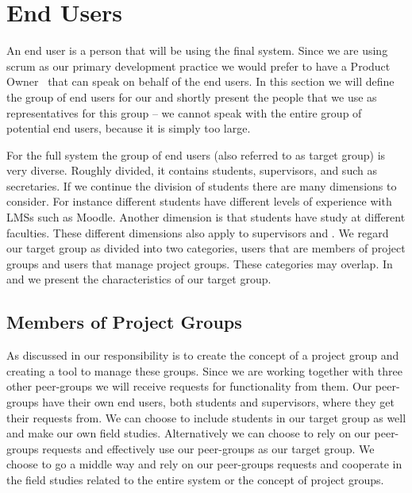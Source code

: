 \section{End Users}
\label{sec:enduser}
An end user is a person that will be using the final system.
Since we are using scrum as our primary development practice we would prefer to have a Product Owner~\cite[p.~115]{Larman04} that can speak on behalf of the end users.
In this section we will define the group of end users for our \subsystem{} and shortly present the people that we use as representatives for this group -- we cannot speak with the entire group of potential end users, because it is simply too large.

For the full system the group of end users (also referred to as target group) is very diverse.
Roughly divided, it contains students, supervisors, and \admpers{} such as secretaries.
If we continue the division of students there are many dimensions to consider. 
For instance different students have different levels of experience with LMSs such as Moodle. Another dimension is that students have study at different faculties.
These different dimensions also apply to supervisors and \admpers{}.
We regard our target group as divided into two categories, users that are members of project groups and users that  manage project groups.
These categories may overlap.
In  and  we present the characteristics of our target group.

\subsection{Members of Project Groups}
\label{sub:endusersmembers}
As discussed in  our responsibility is to create the concept of a project group and creating a tool to manage these groups.
Since we are working together with three other peer-groups we will receive requests for functionality from them.
Our peer-groups have their own end users, both students and supervisors, where they get their requests from.
We can choose to include students in our target group as well and make our own field studies.
Alternatively we can choose to rely on our peer-groups requests and effectively use our peer-groups as our target group.
We choose to go a middle way and rely on our peer-groups requests and cooperate in the field studies related to the entire system or the concept of project groups.

